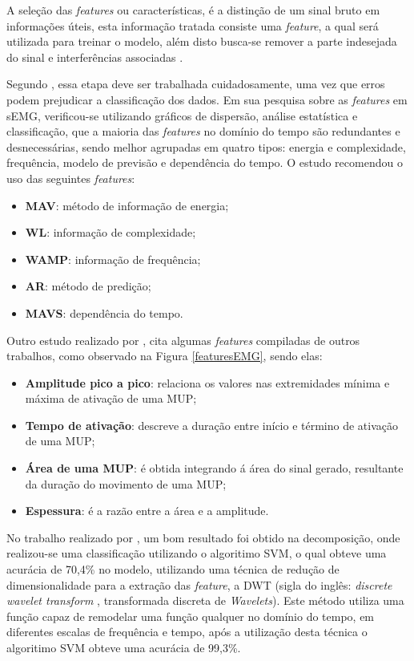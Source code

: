 A seleção das \textit{features} ou características, é a distinção de um sinal bruto em informações úteis, esta informação tratada consiste uma \textit{feature}, a qual será utilizada para treinar o modelo, além disto busca-se remover a parte indesejada do sinal e interferências associadas \cite{phinyomark2012feature}.

Segundo , essa etapa deve ser trabalhada cuidadosamente, uma vez que erros podem prejudicar a classificação dos dados. Em sua pesquisa sobre as \textit{features} em sEMG, verificou-se utilizando gráficos de dispersão, análise estatística e classificação, que a maioria das \textit{features} no domínio do tempo são redundantes e desnecessárias, sendo melhor agrupadas em quatro tipos: energia e complexidade, frequência, modelo de previsão e dependência do tempo. O estudo recomendou o uso das seguintes \textit{features}:

\begin{itemize}
    \item \textbf{MAV}: método de informação de energia;
    \item \textbf{WL}: informação de complexidade;
    \item \textbf{WAMP}: informação de frequência;
    \item \textbf{AR}: método de predição;
    \item \textbf{MAVS}: dependência do tempo.
\end{itemize}

Outro estudo realizado por , cita algumas \textit{features} compiladas de outros trabalhos, como observado na Figura \ref{featuresEMG}, sendo elas:

\begin{itemize}
    \item \textbf{Amplitude pico a pico}: relaciona os valores nas extremidades mínima e máxima de ativação de uma MUP;
    \item \textbf{Tempo de ativação}: descreve a duração entre início e término de ativação de uma MUP;
    \item \textbf{Área de uma MUP}: é obtida integrando á área do sinal gerado, resultante da duração do movimento de uma MUP;
    \item \textbf{Espessura}: é a razão entre a área e a amplitude.
\end{itemize}

No trabalho realizado por , um bom resultado foi obtido na decomposição, onde realizou-se uma classificação utilizando o algoritimo SVM, o qual obteve uma acurácia de 70,4\% no modelo, utilizando uma técnica de redução de dimensionalidade para a extração das \textit{feature}, a DWT (sigla do inglês: \textit{discrete wavelet transform }, transformada discreta de \textit{Wavelets}). Este método utiliza uma função capaz de remodelar uma função qualquer no domínio do tempo, em diferentes escalas de frequência e tempo, após a utilização desta técnica o algoritimo SVM obteve uma acurácia de 99,3\%.

